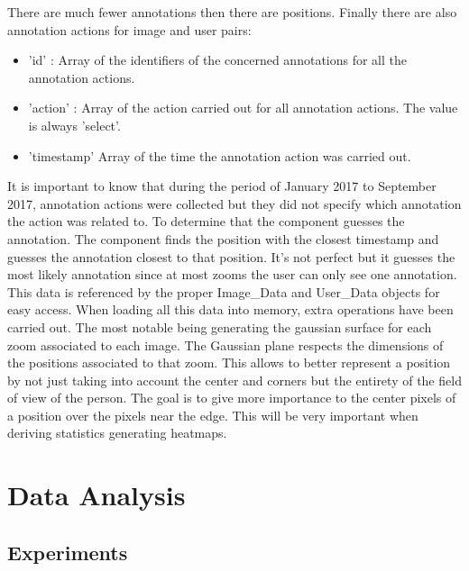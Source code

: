 \documentclass[a4paper,11pt]{report}
\numberwithin{figure}{section} %
\begin{document}
    There are much fewer annotations then there are positions. Finally there are also annotation actions for image and user pairs:
    \begin{itemize}
        \item[\textbullet] 'id' : Array of the identifiers of the concerned annotations for all the annotation actions.
        \item[\textbullet] 'action' : Array of the action carried out for all annotation actions. The value is always 'select'.
        \item[\textbullet] 'timestamp' Array of the time the annotation action was carried out.
    \end{itemize}
    It is important to know that during the period of January 2017 to September 2017, annotation actions were collected but they did not specify which annotation the action was related to.
    To determine that the component guesses the annotation. The component finds the position with the closest timestamp and guesses the annotation closest to that position. It's not perfect but it guesses the most likely annotation since at most zooms the user can only see one annotation.\\


    This data is referenced by the proper Image\_Data and User\_Data objects for easy access. When loading all this data into memory, extra operations have been carried out. The most notable being generating the gaussian surface for each zoom associated to each image.
    The Gaussian plane respects the dimensions of the positions associated to that zoom. This allows to better represent a position by not just taking into account the center and corners but the entirety of the field of view of the person.
    The goal is to give more importance to the center pixels of a position over the pixels near the edge. This will be very important when deriving statistics generating heatmaps.

    \subsection{}


\section{Data Analysis}

	\subsection{Experiments}
    
\end{document}
